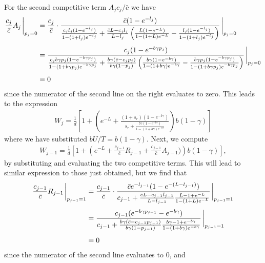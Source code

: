 \documentclass[9pt,twocolumn,twoside]{article}
\begin{document}
\begin{appendix}
\[\begin{aligned}
\end{aligned}
\]
For the second competitive term $A_j c_j/\bar{c}$ we have
\[
\begin{aligned}
\frac{c_j}{\bar{c}}A_{j}\eval_{p_j=0} &=  \frac{c_j}{\bar{c}} \cdot \frac{\bar{c}(1-e^{-l_{j}})}{ \frac{c_j l_j(1-e^{-l_{j}})}{1-(1+l_{j})e^{-l_{j}}}+\frac{\bar{c}L-c_jl_{j}}{L-l_{j}}\left(\frac{L(1-e^{-L})}{1-(1+L)e^{-L}}-\frac{l_{j}(1-e^{-l_{j}})}{1-(1+l_{j})e^{-l_{j}}}\right)} \eval_{p_j=0}\\[4pt]
&=  \frac{c_j(1-e^{-b\gamma p_j})}{ \frac{c_jb\gamma p_j(1-e^{-b\gamma p_j})}{1-(1+b\gamma p_j)e^{-b\gamma p_j}}+\frac{b\gamma(\bar{c}-c_jp_j)}{b\gamma(1-p_{j})}\left(\frac{b\gamma(1-e^{-b\gamma})}{1-(1+b\gamma)e^{-b\gamma}}-\frac{b\gamma p_{j}(1-e^{-b\gamma p_{j}})}{1-(1+b\gamma p_{j})e^{-b\gamma p_{j}}}\right)}\eval_{p_j=0}\\[4pt]
&=  0
\end{aligned}
\]
since the numerator of the second line on the right evaluates to zero. This leads to the expression
\begin{equation}
\begin{aligned}
W_j  = \frac{1}{d}\left[1+\left(e^{-L} + \frac{(1+s_r)(1-e^{-b\gamma})}{s_r + \frac{b\gamma(1-e^{-b\gamma})}{1-(1+b\gamma)e^{-b\gamma}}}\right)b(1-\gamma)\right]
\end{aligned}
\end{equation}
where we have substituted $bU/T = b(1-\gamma)$. Next, we compute
\[
\begin{aligned}
W_{j-1} = \frac{1}{d}\left[1+\left(e^{-L} +\frac{c_{j-1}}{\bar{c}}R_{j-1}+ \frac{c_{j-1}}{\bar{c}}A_{j-1})\right)b(1-\gamma)\right],
\end{aligned}
\]
by substituting and evaluating the two competitive terms. This will lead to similar expression to those just obtained, but we find that 
\[
\begin{aligned}
\frac{c_{j-1}}{\bar{c}} R_{j-1}\eval_{p_{j-1}=1} &= \frac{c_{j-1}}{\bar{c}} \cdot \frac{\bar{c}e^{-l_{j-1}}(1-e^{-(L-l_{j-1})})}{c_{j-1} +\frac{\bar{c}L-c_{j-1}l_{j-1}}{L-l_{j-1}}\frac{L-1+e^{-L}}{1-(1+L)e^{-L}}}\eval_{p_{j-1}=1} \\[4pt]
&= 
\frac{c_{j-1}(e^{-b\gamma p_{j-1}}-e^{-b\gamma})}{c_{j-1} +\frac{b\gamma (\bar{c}-c_{j-1}p_{j-1})}{b\gamma (1-p_{j-1})}\frac{b\gamma-1+e^{-b\gamma}}{1-(1+b\gamma)e^{-b\gamma}}}\eval_{p_{j-1}=1} \\[4pt]
&= 0
\end{aligned}
\]
since the numerator of the second line evaluates to $0$, and 
\[
\begin{aligned}

\end{aligned}\]
\end{appendix}
\end{document}
